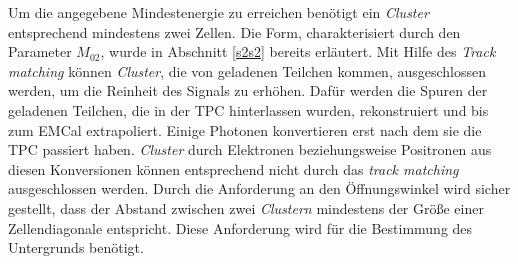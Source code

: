 Um die angegebene Mindestenergie zu erreichen benötigt ein \textit{Cluster} entsprechend mindestens zwei Zellen.
Die Form, charakterisiert durch den Parameter $M_{02}$, wurde in Abschnitt \ref{s2s2} bereits erläutert.
Mit Hilfe des \textit{Track matching} können \textit{Cluster}, die von geladenen Teilchen kommen, ausgeschlossen werden, um die Reinheit des Signals zu erhöhen.
Dafür werden die Spuren der geladenen Teilchen, die in der TPC hinterlassen wurden, rekonstruiert und bis zum EMCal extrapoliert.
Einige Photonen konvertieren erst nach dem sie die TPC passiert haben.
\textit{Cluster} durch Elektronen beziehungsweise Positronen aus diesen Konversionen können entsprechend nicht durch das \textit{track matching} ausgeschlossen werden. 
\newline
Durch die Anforderung an den Öffnungswinkel wird sicher gestellt, dass der Abstand zwischen zwei \textit{Clustern} mindestens der Größe einer Zellendiagonale entspricht.
Diese Anforderung wird für die Bestimmung des Untergrunds benötigt.